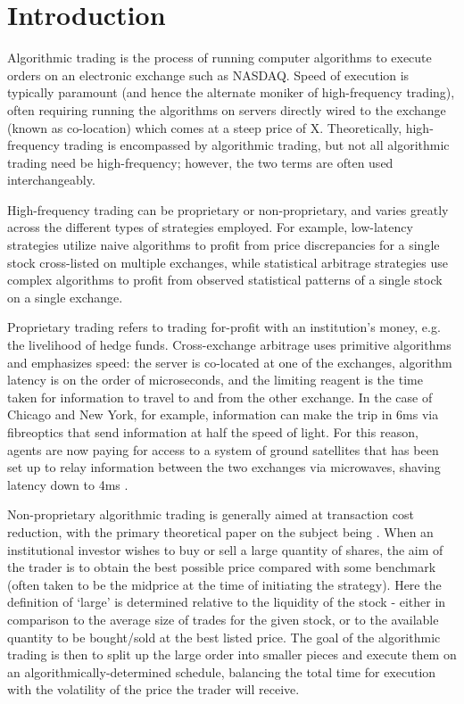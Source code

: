 \chapter{Introduction}

Algorithmic trading is the process of running computer algorithms to execute orders on an electronic exchange such as NASDAQ. Speed of execution is typically paramount (and hence the alternate moniker of high-frequency trading), often requiring running the algorithms on servers directly wired to the exchange (known as co-location) which comes at a steep price of X. Theoretically, high-frequency trading is encompassed by algorithmic trading, but not all algorithmic trading need be high-frequency; however, the two terms are often used interchangeably. 

High-frequency trading can be proprietary or non-proprietary, and varies greatly across the different types of strategies employed. For example, low-latency strategies utilize naive algorithms to profit from price discrepancies for a single stock cross-listed on multiple exchanges, while statistical arbitrage strategies use complex algorithms to profit from observed statistical patterns of a single stock on a single exchange.

Proprietary trading refers to trading for-profit with an institution's money, e.g. the livelihood of hedge funds. Cross-exchange arbitrage uses primitive algorithms and emphasizes speed: the server is co-located at one of the exchanges, algorithm latency is on the order of microseconds, and the limiting reagent is the time taken for information to travel to and from the other exchange. In the case of Chicago and New York, for example, information can make the trip in 6ms via fibreoptics that send information at half the speed of light. For this reason, agents are now paying for access to a system of ground satellites that has been set up to relay information between the two exchanges via microwaves, shaving latency down to 4ms \cite{Laughlin14}.

Non-proprietary algorithmic trading is generally aimed at transaction cost reduction, with the primary theoretical paper on the subject being \cite{Almgren01}. When an institutional investor wishes to buy or sell a large quantity of shares, the aim of the trader is to obtain the best possible price compared with some benchmark (often taken to be the midprice at the time of initiating the strategy). Here the definition of `large' is determined relative to the liquidity of the stock - either in comparison to the average size of trades for the given stock, or to the available quantity to be bought/sold at the best listed price. The goal of the algorithmic trading is then to split up the large order into smaller pieces and execute them on an algorithmically-determined schedule, balancing the total time for execution with the volatility of the price the trader will receive. 

